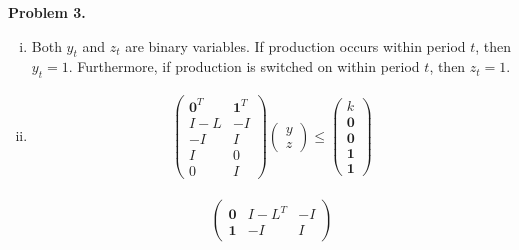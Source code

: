 \documentclass[11pt,a4paper]{article}
\begin{document}
\textbf{Problem 3.}
\begin{enumerate}[i)]
    \item Both $y_t$ and $z_t$ are binary variables. If production occurs within period $t$, then $y_t = 1$. Furthermore, if production is switched on within period $t$, then $z_t = 1$.
    \item
    \begin{align}
        \begin{pmatrix}
            \mathbf{0}^T & \mathbf{1}^T \\
            I - L & -I \\
            -I & I \\
            I & 0 \\
            0 & I
        \end{pmatrix}
        \begin{pmatrix}
            y \\
            z
        \end{pmatrix}
        \leq
        \begin{pmatrix}
            k \\
            \mathbf{0} \\
            \mathbf{0} \\
            \mathbf{1} \\
            \mathbf{1}
        \end{pmatrix}
    \end{align}

    \begin{align}
        \begin{pmatrix}
            \mathbf{0} & I - L^T & -I \\
            \mathbf{1} & -I & I
        \end{pmatrix}
    \end{align}
\end{enumerate}
\end{document}
